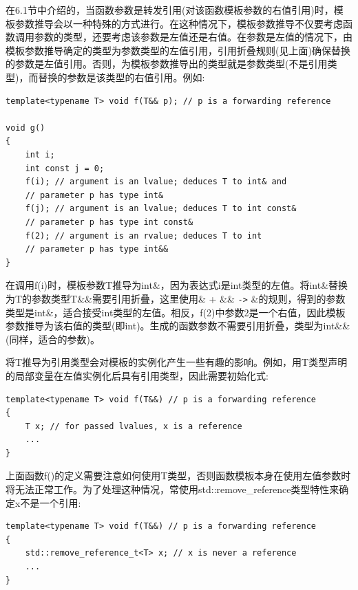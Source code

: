 
在6.1节中介绍的，当函数参数是转发引用(对该函数模板参数的右值引用)时，模板参数推导会以一种特殊的方式进行。在这种情况下，模板参数推导不仅要考虑函数调用参数的类型，还要考虑该参数是左值还是右值。在参数是左值的情况下，由模板参数推导确定的类型为参数类型的左值引用，引用折叠规则(见上面)确保替换的参数是左值引用。否则，为模板参数推导出的类型就是参数类型(不是引用类型)，而替换的参数是该类型的右值引用。例如:

\begin{lstlisting}[style=styleCXX]
template<typename T> void f(T&& p); // p is a forwarding reference

void g()
{
	int i;
	int const j = 0;
	f(i); // argument is an lvalue; deduces T to int& and
	// parameter p has type int&
	f(j); // argument is an lvalue; deduces T to int const&
	// parameter p has type int const&
	f(2); // argument is an rvalue; deduces T to int
	// parameter p has type int&&
}
\end{lstlisting}

在调用f(i)时，模板参数T推导为int\&，因为表达式i是int类型的左值。将int\&替换为T的参数类型T\&\&需要引用折叠，这里使用\& + \&\& \texttt{->} \&的规则，得到的参数类型是int\&，适合接受int类型的左值。相反，f(2)中参数2是一个右值，因此模板参数推导为该右值的类型(即int)。生成的函数参数不需要引用折叠，类型为int\&\&(同样，适合的参数)。

将T推导为引用类型会对模板的实例化产生一些有趣的影响。例如，用T类型声明的局部变量在左值实例化后具有引用类型，因此需要初始化式:

\begin{lstlisting}[style=styleCXX]
template<typename T> void f(T&&) // p is a forwarding reference
{
	T x; // for passed lvalues, x is a reference
	...
}
\end{lstlisting}

上面函数f()的定义需要注意如何使用T类型，否则函数模板本身在使用左值参数时将无法正常工作。为了处理这种情况，常使用std::remove\_reference类型特性来确定x不是一个引用:

\begin{lstlisting}[style=styleCXX]
template<typename T> void f(T&&) // p is a forwarding reference
{
	std::remove_reference_t<T> x; // x is never a reference
	...
}
\end{lstlisting}



